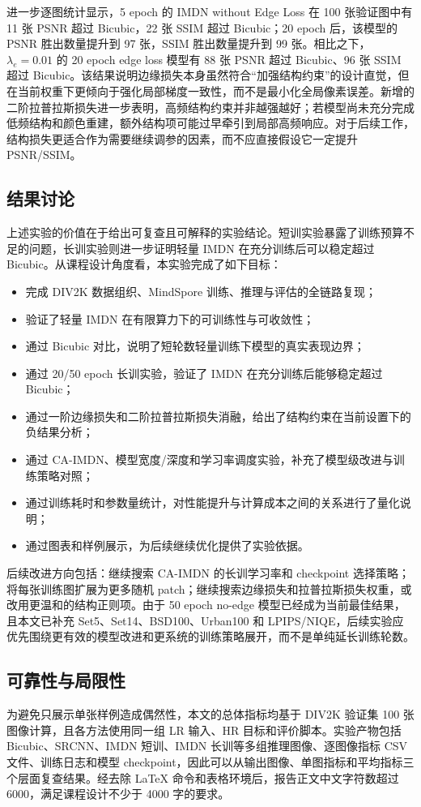 \documentclass[bwprint]{report}
\begin{document}
进一步逐图统计显示，5 epoch 的 IMDN without Edge Loss 在 100 张验证图中有 11 张 PSNR 超过 Bicubic，22 张 SSIM 超过 Bicubic；20 epoch 后，该模型的 PSNR 胜出数量提升到 97 张，SSIM 胜出数量提升到 99 张。相比之下，$\lambda_e=0.01$ 的 20 epoch edge loss 模型有 88 张 PSNR 超过 Bicubic、96 张 SSIM 超过 Bicubic。该结果说明边缘损失本身虽然符合“加强结构约束”的设计直觉，但在当前权重下更倾向于强化局部梯度一致性，而不是最小化全局像素误差。新增的二阶拉普拉斯损失进一步表明，高频结构约束并非越强越好；若模型尚未充分完成低频结构和颜色重建，额外结构项可能过早牵引到局部高频响应。对于后续工作，结构损失更适合作为需要继续调参的因素，而不应直接假设它一定提升 PSNR/SSIM。

\subsection{结果讨论}
上述实验的价值在于给出可复查且可解释的实验结论。短训实验暴露了训练预算不足的问题，长训实验则进一步证明轻量 IMDN 在充分训练后可以稳定超过 Bicubic。从课程设计角度看，本实验完成了如下目标：
\begin{itemize}
    \item 完成 DIV2K 数据组织、MindSpore 训练、推理与评估的全链路复现；
    \item 验证了轻量 IMDN 在有限算力下的可训练性与可收敛性；
    \item 通过 Bicubic 对比，说明了短轮数轻量训练下模型的真实表现边界；
    \item 通过 20/50 epoch 长训实验，验证了 IMDN 在充分训练后能够稳定超过 Bicubic；
    \item 通过一阶边缘损失和二阶拉普拉斯损失消融，给出了结构约束在当前设置下的负结果分析；
    \item 通过 CA-IMDN、模型宽度/深度和学习率调度实验，补充了模型级改进与训练策略对照；
    \item 通过训练耗时和参数量统计，对性能提升与计算成本之间的关系进行了量化说明；
    \item 通过图表和样例展示，为后续继续优化提供了实验依据。
\end{itemize}

后续改进方向包括：继续搜索 CA-IMDN 的长训学习率和 checkpoint 选择策略；将每张训练图扩展为更多随机 patch；继续搜索边缘损失和拉普拉斯损失权重，或改用更温和的结构正则项。由于 50 epoch no-edge 模型已经成为当前最佳结果，且本文已补充 Set5、Set14、BSD100、Urban100 和 LPIPS/NIQE，后续实验应优先围绕更有效的模型改进和更系统的训练策略展开，而不是单纯延长训练轮数。

\subsection{可靠性与局限性}
为避免只展示单张样例造成偶然性，本文的总体指标均基于 DIV2K 验证集 100 张图像计算，且各方法使用同一组 LR 输入、HR 目标和评价脚本。实验产物包括 Bicubic、SRCNN、IMDN 短训、IMDN 长训等多组推理图像、逐图像指标 CSV 文件、训练日志和模型 checkpoint，因此可以从输出图像、单图指标和平均指标三个层面复查结果。经去除 \LaTeX{} 命令和表格环境后，报告正文中文字符数超过 6000，满足课程设计不少于 4000 字的要求。
\end{document}
